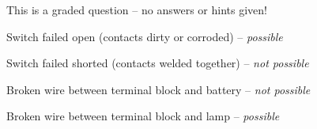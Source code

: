 \vfil 

\eject






This is a graded question -- no answers or hints given!







\medskip
\item{} Switch failed open (contacts dirty or corroded) -- {\it possible} 
\item{} Switch failed shorted (contacts welded together) -- {\it not possible}
\item{} Broken wire between terminal block and battery -- {\it not possible}
\item{} Broken wire between terminal block and lamp -- {\it possible}
\medskip




